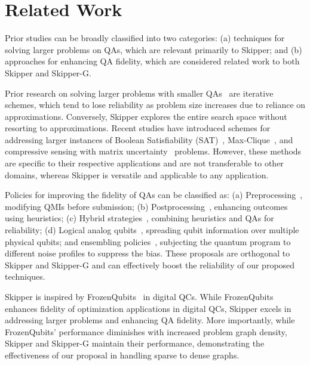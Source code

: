 \section{Related Work} \label{sec:related_work}

Prior studies can be broadly classified into two categories: 
(a) techniques for solving larger problems on QAs, which are relevant primarily to Skipper; 
and (b) approaches for enhancing QA fidelity, which are considered related work to both Skipper and Skipper-G.

Prior research on solving larger problems with smaller QAs~\cite{pelofske2022solving, okada2019improving} are iterative schemes, which tend to lose reliability as problem size increases due to reliance on approximations.
Conversely, Skipper explores the entire search space without resorting to approximations.
Recent studies have introduced schemes for addressing larger instances of Boolean Satisfiability (SAT)~\cite{tan2023hyqsat}, Max-Clique~\cite{pelofske2023solving, pelofske2019solving, pelofske2022parallel, pelofske2021decomposition}, and compressive sensing with matrix uncertainty~\cite{ayanzadeh2019quantum} problems. 
However, these methods are specific to their respective applications and are not transferable to other domains, whereas Skipper is versatile and applicable to any application. 


Policies for improving the fidelity of QAs can be classified as: 
(a) Preprocessing~\cite{pelofske2019optimizing,ayanzadeh2022equal,ayanzadeh2020reinforcement}, modifying QMIs before submission;
(b) Postprocessing~\cite{ayanzadeh2021multi}, enhancing outcomes using heuristics;
(c) Hybrid strategies~\cite{ayanzadeh2022quantum,ayanzadeh2020leveraging}, combining heuristics and QAs for reliability; 
(d) Logical analog qubits~\cite{jordan2006error,sarovar2013error,young2013error,pudenz2014error,vinci2015quantum,venturelli2015quantum,vinci2016nested,matsuura2016mean,mishra2016performance,matsuura2017quantum,vinci2018scalable,pearson2019analog,matsuura2019nested,mohseni2021error}, spreading qubit information over multiple physical qubits;
and ensembling policies~\cite{ ayanzadeh2022equal,ayanzadeh2020reinforcement,ayanzadeh2020ensemble}, subjecting the quantum program to different noise profiles to suppress the bias. 
These proposals are orthogonal  to Skipper and Skipper-G and can effectively boost the reliability of our proposed techniques. 


Skipper is inspired by FrozenQubits~\cite{ayanzadeh2023frozenqubits} in digital QCs. 
While FrozenQubits enhances fidelity of optimization applications in digital QCs, Skipper excels in addressing larger problems and enhancing QA fidelity. 
More importantly, while FrozenQubits' performance diminishes with increased problem graph density, Skipper and Skipper-G maintain their performance, demonstrating the effectiveness of our proposal in handling sparse to dense graphs.




